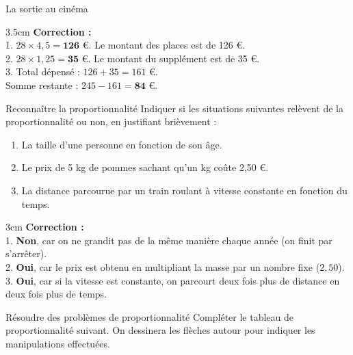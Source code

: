 \documentclass[a4paper]{book}
\begin{document}
{\begin{exerciceTitre}{La sortie au cinéma}
        \begin{ZoneReponse}{3.5cm}
            \textbf{Correction :} \\
            1. $28 \times 4,5 = \mathbf{126}$ \euro. Le montant des places est de 126 \euro. \\
            2. $28 \times 1,25 = \mathbf{35}$ \euro. Le montant du supplément est de 35 \euro. \\
            3. Total dépensé : $126 + 35 = 161$ \euro. \\
            Somme restante : $245 - 161 = \mathbf{84}$ \euro.
        \end{ZoneReponse}
    \end{exerciceTitre}
    

    \begin{exerciceTitre}{Reconnaître la proportionnalité}
        Indiquer si les situations suivantes relèvent de la proportionnalité ou non, en justifiant brièvement :
        \begin{enumerate}
            \item La taille d'une personne en fonction de son âge.
            \item Le prix de 5 kg de pommes sachant qu'un kg coûte 2,50 \euro. 
            \item La distance parcourue par un train roulant à vitesse constante en fonction du temps.
        \end{enumerate}
        
        \begin{ZoneReponse}{3cm}
            \textbf{Correction :} \\
            1. \textbf{Non}, car on ne grandit pas de la même manière chaque année (on finit par s'arrêter). \\
            2. \textbf{Oui}, car le prix est obtenu en multipliant la masse par un nombre fixe ($2,50$). \\
            3. \textbf{Oui}, car si la vitesse est constante, on parcourt deux fois plus de distance en deux fois plus de temps.
        \end{ZoneReponse}
    \end{exerciceTitre}


\newpage


    \begin{exerciceTitre}{Résoudre des problèmes de proportionnalité}
        Compléter le tableau de proportionnalité suivant. On dessinera les flèches autour pour indiquer les manipulations effectuées.
        

\end{exerciceTitre}}
\end{document}

